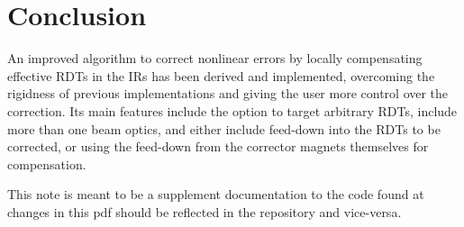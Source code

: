 \section{Conclusion}

An improved algorithm to correct nonlinear errors by locally compensating effective RDTs in the IRs has been derived and implemented, 
overcoming the rigidness of previous implementations and giving the user more control over the correction.
Its main features include the option to target arbitrary RDTs, include more than one beam optics,
and either include feed-down into the RDTs to be corrected, 
or using the feed-down from the corrector magnets themselves for compensation.

This note is meant to be a supplement documentation to the code found at~\cite{OMC-TeamIRNLRDTCorrection}
changes in this pdf should be reflected in the repository and vice-versa. 
